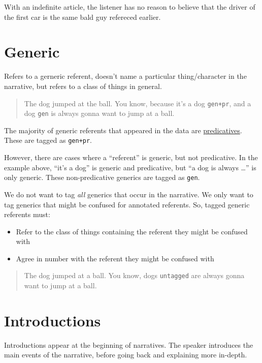 \documentclass[
]{book}
\begin{document}
With an indefinite article,
the listener has no reason to believe that the driver of the first car
is the same bald guy refereced earlier.

\hypertarget{generic}{%
\section{Generic}\label{generic}}

Refers to a gerneric referent,
doesn't name a particular thing/character in the narrative,
but refers to a class of things in general.

\begin{quote}
The dog jumped at the ball.
You know, because it's a dog \texttt{gen+pr},
and a dog \texttt{gen} is always gonna want to jump at a ball.
\end{quote}

The majority of generic referents that appeared in the data are \protect\hyperlink{predicative}{predicatives}. These are tagged as \texttt{gen+pr}.

However,
there are cases where a ``referent'' is generic, but not predicative.
In the example above, ``it's a dog'' is generic and predicative,
but ``a dog is always \ldots{}'' is only generic.
These non-predicative generics are tagged as \texttt{gen}.

We do not want to tag \emph{all} generics that occur in the narrative.
We only want to tag generics that might be confused for annotated referents.
So, tagged generic referents must:

\begin{itemize}
\item
  Refer to the class of things containing the referent they might be confused with
\item
  Agree in number with the referent they might be confused with
\end{itemize}

\begin{quote}
The dog jumped at a ball.
You know, dogs \texttt{untagged} are always gonna want to jump at a ball.
\end{quote}

\hypertarget{introductions}{%
\section{Introductions}\label{introductions}}

Introductions appear at the beginning of narratives.
The speaker introduces the main events of the narrative,
before going back and explaining more in-depth.
\end{document}
